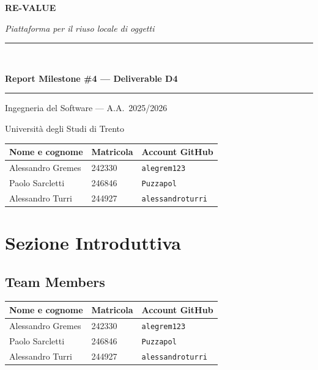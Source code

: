 \documentclass[11pt,a4paper]{article}
\newcommand{\code}[1]{\texttt{#1}}
\begin{document}
\hypersetup{pageanchor=false}

\begin{titlepage}
  \centering
  \vspace*{2.5cm}
  {\Huge\bfseries RE-VALUE\par}
  \vspace{0.6em}
  {\large\itshape Piattaforma per il riuso locale di oggetti\par}
  \vspace{1.5em}
  \rule{\linewidth}{0.6pt}\\[0.8em]
  {\LARGE\bfseries Report Milestone \#4 --- Deliverable D4\par}
  \rule{\linewidth}{0.6pt}
  \vspace{1.5em}
  {\large Ingegneria del Software --- A.A.\ 2025/2026\par}
  {\large Università degli Studi di Trento\par}
  \vspace{2em}

  \begin{tabular}{L{4.5cm}C{3cm}C{4cm}}
    \toprule
    \textbf{Nome e cognome} & \textbf{Matricola} & \textbf{Account GitHub} \\
    \midrule
    Alessandro Gremes  & 242330 & \code{alegrem123}      \\
    Paolo Sarcletti    & 246846 & \code{Puzzapol}        \\
    Alessandro Turri   & 244927 & \code{alessandroturri} \\
    \bottomrule
  \end{tabular}

\end{titlepage}

\hypersetup{pageanchor=true}
\tableofcontents
\clearpage
{}

\section{Sezione Introduttiva}

\subsection{Team Members}

\begin{table}[H]
  \centering\scriptsize
  \begin{tabular}{L{5cm}C{2.5cm}L{5cm}}
    \toprule
    \textbf{Nome e cognome} & \textbf{Matricola} & \textbf{Account GitHub} \\
    \midrule
    Alessandro Gremes  & 242330 & \code{alegrem123} \\
    Paolo Sarcletti    & 246846 & \code{Puzzapol} \\
    Alessandro Turri   & 244927 & \code{alessandroturri} \\
    \bottomrule
  \end{tabular}
\end{table}
\end{document}
